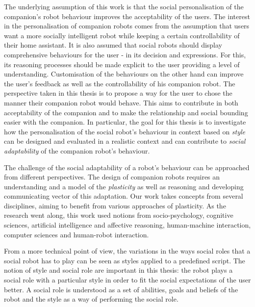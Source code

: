 \documentclass[a4paper,twocolumn]{svjour3}
\begin{document}
The underlying assumption of this work is that the social personalisation of the companion's robot behaviour improves the acceptability of the users.
The interest in the personalisation of companion robots comes from the assumption that users want a more socially intelligent robot while keeping a certain controllability of their home assistant.
It is also assumed that social robots should display comprehensive behaviours for the user - in its decision and expressions.
For this, its reasoning processes should be made explicit to the user providing a level of understanding. 
Customisation of the behaviours on the other hand can improve the user's feedback as well as the controllability of his companion robot.
The perspective taken in this thesis is to propose a way for the user to chose the manner their companion robot would behave. 
This aims to contribute in both acceptability of the companion and to make the relationship and social bounding easier with the companion. 
In particular, the goal for this thesis is to investigate how the personalisation of the social robot's behaviour in context based on \textit{style} can be designed and evaluated in a realistic context and can contribute to \textit{social adaptability} of the companion robot's behaviour.

The challenge of the social adaptability of a robot's behaviour can be approached from different perspectives. 
The design of companion robots requires an understanding and a model of the \textit{plasticity} as well as reasoning and developing communicating vector of this adaptation. 
Our work takes concepts from several disciplines, aiming to benefit from various approaches of plasticity.
As the research went along, this work used notions from socio-psychology, cognitive sciences, artificial intelligence and affective reasoning, human-machine interaction, computer sciences and human-robot interaction.

From a more technical point of view, the variations in the ways social roles that a social robot  has to play can be seen as styles applied to a predefined script.
The notion of style and social role are important in this thesis: the robot plays a social role with a particular style in order to fit  the social expectations of the user better.
A social role is understood as a set of abilities, goals and beliefs of the robot and the style as a way of performing the social role.


\end{document}
